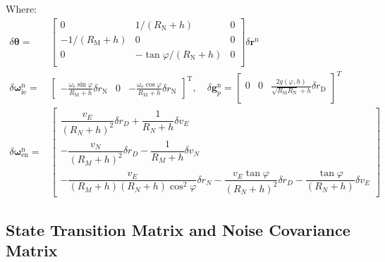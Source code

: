 \documentclass{article}
\begin{document}
Where:
\begin{equation}
    \begin{aligned}
        \delta \boldsymbol{\theta} =& 
        \left[ \begin{matrix}
        0&		1/\left( {R}_{\mathrm{N}}+{h} \right)&		0\\
        -1/\left( {R}_{\mathrm{M}}+{h} \right)&		0&		0\\
        0&		-\tan \varphi /\left( {R}_{\mathrm{N}}+{h} \right)&		0\\
        \end{matrix} \right] 
        \delta \boldsymbol{r}^{\mathrm{n}} \\ 
        \delta \boldsymbol{\omega}_{\mathrm{ie}}^{\mathrm{n}} =& \left[\begin{matrix}	\displaystyle{-\frac{\omega_{\mathrm{e}}\sin\varphi}{{R}_{\mathrm{M}}+{h}}\delta {r}_{\mathrm{N}}} & 0 & \displaystyle{-\frac{\omega_{\mathrm{e}}\cos\varphi}{{R}_{\mathrm{M}}+{h}}\delta {r}_{\mathrm{N}}}	\end{matrix}\right]^\text{T}, \quad 
        \delta \boldsymbol{g}_{p}^{\mathrm{n}}=\left[ \begin{matrix}
            0 & 0 & \displaystyle{\frac{2{g}\left( \varphi ,{h} \right)}{\sqrt{{R}_{\mathrm{M}}{R}_{\mathrm{N}}}+{h}}\delta {r}_{\mathrm{D}}}\\
        \end{matrix} \right]^T \\
        \delta \boldsymbol{\omega}_{\mathrm{en}}^{\mathrm{n}} =& \left[\begin{matrix}
            \dfrac{{v}_{E}}{({R}_{N}+{h})^2}\delta {r}_{D} + \dfrac{1}{{R}_{N}+{h}}\delta {v}_{E} \\
            -\dfrac{{v}_{N}}{({R}_{M}+{h})^2}\delta {r}_{D}  - \dfrac{1}{{R}_{M}+{h}}\delta {v}_{N}  \\
            -\dfrac{{v}_{E}}{({R}_{M}+{h})({R}_{N}+{h})\cos^2\varphi}\delta {r}_{N} - \dfrac{{v}_{E}\tan\varphi}{({R}_{N}+{h})^2}\delta {r}_{D} - \dfrac{\tan\varphi}{({R}_{N}+{h})}\delta {v}_{E}
        \end{matrix}\right]
    \end{aligned}
\end{equation}

\subsection{State Transition Matrix and Noise Covariance Matrix}
\end{document}
